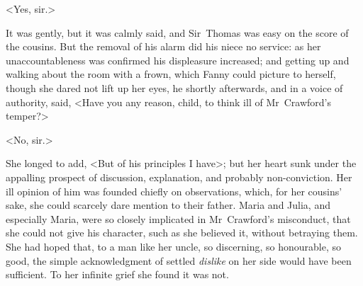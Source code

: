 <Yes, sir.>

It was gently, but it was calmly said, and Sir~Thomas was easy on the score of the cousins. But the removal of his alarm did his niece no service: as her unaccountableness was confirmed his displeasure increased; and getting up and walking about the room with a frown, which Fanny could picture to herself, though she dared not lift up her eyes, he shortly afterwards, and in a voice of authority, said, <Have you any reason, child, to think ill of Mr~Crawford's temper?>

<No, sir.>

She longed to add, <But of his principles I have>; but her heart sunk under the appalling prospect of discussion, explanation, and probably non-conviction. Her ill opinion of him was founded chiefly on observations, which, for her cousins' sake, she could scarcely dare mention to their father. Maria and Julia, and especially Maria, were so closely implicated in Mr~Crawford's misconduct, that she could not give his character, such as she believed it, without betraying them. She had hoped that, to a man like her uncle, so discerning, so honourable, so good, the simple acknowledgment of settled \textit{dislike}  on her side would have been sufficient. To her infinite grief she found it was not.

